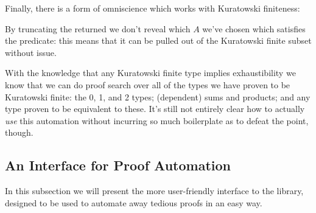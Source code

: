Finally, there is a form of omniscience which works with Kuratowski finiteness:
\begin{agdalisting*}
\end{agdalisting*}
By truncating the returned \AgdaDatatype{\ensuremath{\Sigma}} we don't reveal
which \(A\) we've chosen which satisfies the predicate: this means that it can
be pulled out of the Kuratowski finite subset without issue.
\begin{agdalisting*}
\end{agdalisting*}

With the knowledge that any Kuratowski finite type implies exhaustibility we
know that we can do proof search over all of the types we have proven to be
Kuratowski finite: the 0, 1, and 2 types; (dependent) sums and products; and any
type proven to be equivalent to these.
It's still not entirely clear how to actually \emph{use} this automation without
incurring so much boilerplate as to defeat the point, though.
\subsection{An Interface for Proof Automation}
In this subsection we will present the more user-friendly interface to the library,
designed to be used to automate away tedious proofs in an easy way.
